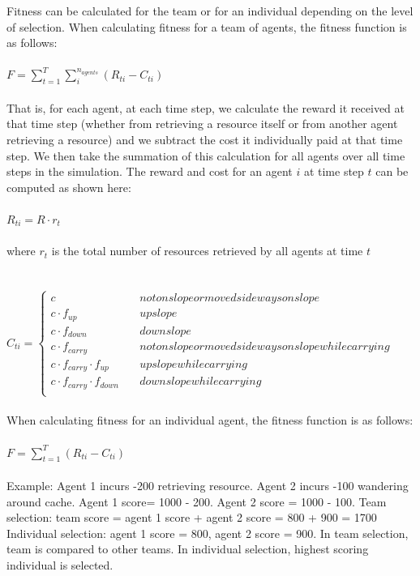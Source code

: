 \documentclass[12pt]{article}
\begin{document}
Fitness can be calculated for the team or for an individual depending on the level of selection.
When calculating fitness for a team of agents, the fitness function is as follows:\\ 
\\
$F = \sum_{t=1}^{T} \sum_{i}^{n_{agents}} (R_{ti} - C_{ti}) $\\
\\
That is, for each agent, at each time step, we calculate the reward it received at that time step (whether from retrieving a resource itself or from another agent retrieving a resource) and we subtract the cost it individually paid at that time step. 
We then take the summation of this calculation for all agents over all time steps in the simulation.
The reward and cost for an agent $i$ at time step $t$ can be computed as shown here:\\
\\
$
R_{ti} = R \cdot r_{t}
$\\
\\
where $r_t$ is the total number of resources retrieved by all agents at time $t$
\\
\\
\\
$
C_{ti} = \left\{
        \begin{array}{ll}
            c & \quad not on slope or moved sideways on slope\\
            c \cdot f_{up} & \quad up slope\\
            c \cdot f_{down} & \quad down slope\\
            c \cdot f_{carry} & \quad not on slope or moved sideways on slope while carrying\\
            c \cdot f_{carry} \cdot f_{up} & \quad up slope while carrying \\
            c \cdot f_{carry} \cdot f_{down} & \quad down slope while carrying\\
        \end{array}
    \right.
$
\\
\\
When calculating fitness for an individual agent, the fitness function is as follows:\\
\\
$F = \sum_{t=1}^{T} (R_{ti} - C_{ti}) $
\\
\\
Example: Agent 1 incurs -200 retrieving resource. 
Agent 2 incurs -100 wandering around cache. 
Agent 1 score= 1000 - 200. 
Agent 2 score = 1000 - 100.
Team selection: team score = agent 1 score + agent 2 score = 800 + 900 = 1700
Individual selection: agent 1 score = 800, agent 2 score = 900. 
In team selection, team is compared to other teams. 
In individual selection, highest scoring individual is selected. 
\end{document}
